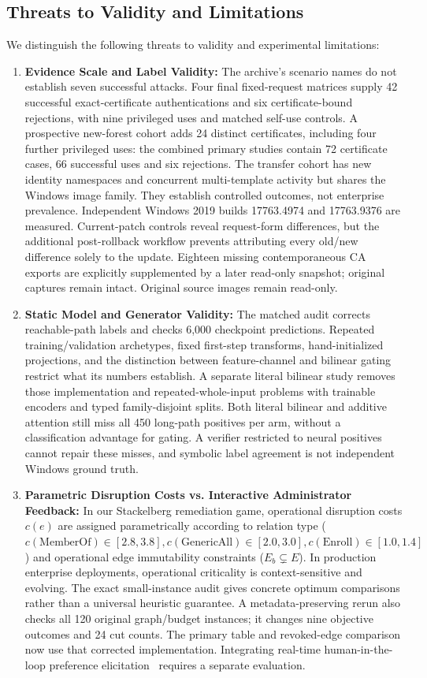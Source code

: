 \subsection{Threats to Validity and Limitations}
We distinguish the following threats to validity and experimental limitations:
\begin{enumerate}
    \item \textbf{Evidence Scale and Label Validity:} The archive's scenario names do not establish seven successful attacks. Four final fixed-request matrices supply 42 successful exact-certificate authentications and six certificate-bound rejections, with nine privileged uses and matched self-use controls. A prospective new-forest cohort adds 24 distinct certificates, including four further privileged uses: the combined primary studies contain 72 certificate cases, 66 successful uses and six rejections. The transfer cohort has new identity namespaces and concurrent multi-template activity but shares the Windows image family. They establish controlled outcomes, not enterprise prevalence. Independent Windows 2019 builds 17763.4974 and 17763.9376 are measured. Current-patch controls reveal request-form differences, but the additional post-rollback workflow prevents attributing every old/new difference solely to the update. Eighteen missing contemporaneous CA exports are explicitly supplemented by a later read-only snapshot; original captures remain intact. Original source images remain read-only.
    \item \textbf{Static Model and Generator Validity:} The matched audit corrects reachable-path labels and checks 6,000 checkpoint predictions. Repeated training/validation archetypes, fixed first-step transforms, hand-initialized projections, and the distinction between feature-channel and bilinear gating restrict what its numbers establish. A separate literal bilinear study removes those implementation and repeated-whole-input problems with trainable encoders and typed family-disjoint splits. Both literal bilinear and additive attention still miss all 450 long-path positives per arm, without a classification advantage for gating. A verifier restricted to neural positives cannot repair these misses, and symbolic label agreement is not independent Windows ground truth.
    \item \textbf{Parametric Disruption Costs vs. Interactive Administrator Feedback:} In our Stackelberg remediation game, operational disruption costs $c(e)$ are assigned parametrically according to relation type ($c(\text{MemberOf}) \in [2.8, 3.8], c(\text{GenericAll}) \in [2.0, 3.0], c(\text{Enroll}) \in [1.0, 1.4]$) and operational edge immutability constraints ($E_b \subsetneq E$). In production enterprise deployments, operational criticality is context-sensitive and evolving. The exact small-instance audit gives concrete optimum comparisons rather than a universal heuristic guarantee. A metadata-preserving rerun also checks all 120 original graph/budget instances; it changes nine objective outcomes and 24 cut counts. The primary table and revoked-edge comparison now use that corrected implementation. Integrating real-time human-in-the-loop preference elicitation~\cite{goel2024hardening} requires a separate evaluation.

\end{enumerate}
